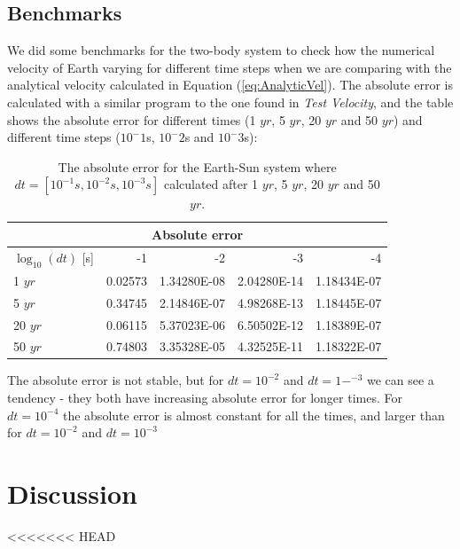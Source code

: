 \documentclass[norsk,a4paper,12pt]{article}
\begin{document}
{\subsection{Benchmarks}
We did some benchmarks for the two-body system to check how the numerical velocity of Earth varying for different time steps when we are comparing with the analytical velocity calculated in Equation (\ref{eq:AnalyticVel}). The absolute error is calculated with a similar program to the one found in \textit{Test Velocity}, and the table shows the absolute error for different times (1 $yr$, 5 $yr$, 20 $yr$ and 50 $yr$) and different time steps ($10^-1$s, $10^-2$s and $10^-3$s):
\begin{table}[H]
\centering
\caption{The absolute error for the Earth-Sun system where $dt=[10^{-1}s,10^{-2}s,10^{-3}s]$ calculated after 1 $yr$, 5 $yr$, 20 $yr$ and 50 $yr$.}
\label{tab:Benchmark}
\begin{tabular}{lrrrr}
\hline
\multicolumn{5}{c}{Absolute error}\\
\hline
$\log_{10}(dt)$ [s]        & -1 & -2 & -3 & -4 \\
\hline
1 $yr$      & 0.02573  & 1.34280E-08  & 2.04280E-14 & 1.18434E-07 \\
5 $yr$      & 0.34745  & 2.14846E-07  & 4.98268E-13 & 1.18445E-07 \\
20 $yr$     & 0.06115  & 5.37023E-06  & 6.50502E-12 & 1.18389E-07 \\
50 $yr$     & 0.74803  & 3.35328E-05  & 4.32525E-11 & 1.18322E-07 \\
\hline
\end{tabular}
\end{table}
The absolute error is not stable, but for $dt=10^{-2}$ and $dt=1-^{-3}$ we can see a tendency - they both have increasing absolute error for longer times. For $dt=10^{-4}$ the absolute error is almost constant for all the times, and larger than for $dt=10^{-2}$ and $dt=10^{-3}$
\section{Discussion}
<<<<<<< HEAD

}
\end{document}
